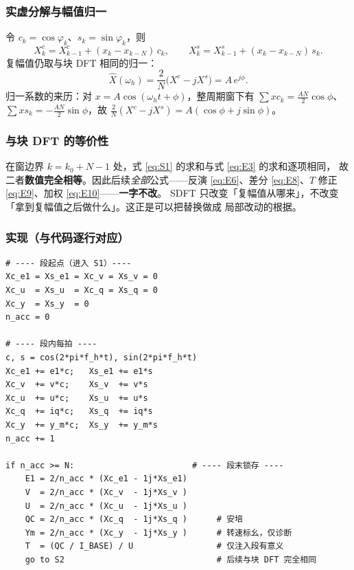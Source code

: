 \documentclass[11pt,a4paper]{ctexart}
\begin{document}
\subsubsection*{实虚分解与幅值归一}

令 $c_k=\cos\varphi_k$、$s_k=\sin\varphi_k$，则
\begin{equation}
X^c_k=X^c_{k-1}+(x_k-x_{k-N})\,c_k,\qquad
X^s_k=X^s_{k-1}+(x_k-x_{k-N})\,s_k .
\label{eq:S4}
\end{equation}
复幅值仍取与块 DFT 相同的归一：
\begin{equation}
\hat X(\omega_h)=\frac2N\big(X^c-jX^s\big)=A\,e^{j\phi} .
\label{eq:S5}
\end{equation}
归一系数的来历：对 $x=A\cos(\omega_ht+\phi)$，整周期窗下有
$\sum x c_k=\frac{AN}{2}\cos\phi$、$\sum x s_k=-\frac{AN}{2}\sin\phi$，故
$\frac2N(X^c-jX^s)=A(\cos\phi+j\sin\phi)$。

\subsubsection*{与块 DFT 的等价性}

在窗边界 $k=k_0+N-1$ 处，式 \eqref{eq:S1} 的求和与式 \eqref{eq:E3} 的求和逐项相同，
故二者\textbf{数值完全相等}。因此后续\emph{全部}公式——反演 \eqref{eq:E6}、差分
\eqref{eq:E8}、$T$ 修正 \eqref{eq:E9}、加权 \eqref{eq:E10}——\textbf{一字不改}。
SDFT 只改变「复幅值从哪来」，不改变「拿到复幅值之后做什么」。这正是可以把替换做成
局部改动的根据。

\subsubsection*{实现（与代码逐行对应）}

\begin{verbatim}
# ---- 段起点（进入 S1）----
Xc_e1 = Xs_e1 = Xc_v = Xs_v = 0
Xc_u  = Xs_u  = Xc_q = Xs_q = 0
Xc_y  = Xs_y  = 0
n_acc = 0

# ---- 段内每拍 ----
c, s = cos(2*pi*f_h*t), sin(2*pi*f_h*t)
Xc_e1 += e1*c;   Xs_e1 += e1*s
Xc_v  += v*c;    Xs_v  += v*s
Xc_u  += u*c;    Xs_u  += u*s
Xc_q  += iq*c;   Xs_q  += iq*s
Xc_y  += y_m*c;  Xs_y  += y_m*s
n_acc += 1

if n_acc >= N:                        # ---- 段末锁存 ----
    E1 = 2/n_acc * (Xc_e1 - 1j*Xs_e1)
    V  = 2/n_acc * (Xc_v  - 1j*Xs_v )
    U  = 2/n_acc * (Xc_u  - 1j*Xs_u )
    QC = 2/n_acc * (Xc_q  - 1j*Xs_q )      # 安培
    Ym = 2/n_acc * (Xc_y  - 1j*Xs_y )      # 转速标幺，仅诊断
    T  = (QC / I_BASE) / U                 # 仅注入段有意义
    go to S2                               # 后续与块 DFT 完全相同
\end{verbatim}
\end{document}
